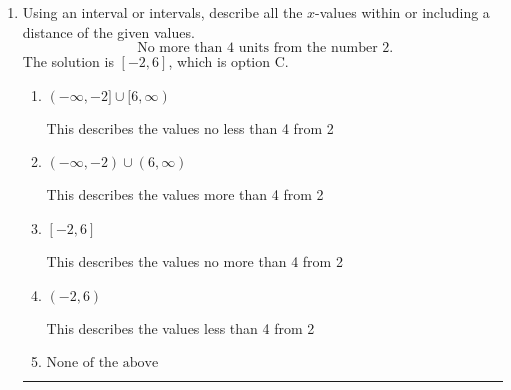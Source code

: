 \documentclass{extbook}[14pt]
\newcommand{\litem}[1]{\item #1

\rule{\textwidth}{0.4pt}}
\begin{document}
\begin{enumerate}
{\begin{enumerate}[label=\Alph*.]
$(-\infty, 4.71] \cup (-7.67, \infty)$, which corresponds to displaying the and-inequality as an or-inequality and getting negatives of the actual endpoints.
\item \( (-\infty, a) \cup [b, \infty), \text{ where } a \in [4.5, 8.25] \text{ and } b \in [-8.25, -6] \)

$(-\infty, 4.71) \cup [-7.67, \infty)$, which corresponds to displaying the and-inequality as an or-inequality AND flipping the inequality AND getting negatives of the actual endpoints.
\item \( [a, b), \text{ where } a \in [3.75, 5.25] \text{ and } b \in [-9.75, -1.5] \)

$[4.71, -7.67)$, which is the correct interval but negatives of the actual endpoints.
\item \( (a, b], \text{ where } a \in [2.25, 6.75] \text{ and } b \in [-9.75, -4.5] \)

$(4.71, -7.67]$, which corresponds to flipping the inequality and getting negatives of the actual endpoints.
\item \( \text{None of the above.} \)

* This is correct as the answer should be $[-4.71, 7.67)$.
\end{enumerate}

\textbf{General Comment:} To solve, you will need to break up the compound inequality into two inequalities. Be sure to keep track of the inequality! It may be best to draw a number line and graph your solution.
}
\litem{
Using an interval or intervals, describe all the $x$-values within or including a distance of the given values.
\[ \text{ No more than } 4 \text{ units from the number } 2. \]The solution is \( [-2, 6] \), which is option C.\begin{enumerate}[label=\Alph*.]
\item \( (-\infty, -2] \cup [6, \infty) \)

This describes the values no less than 4 from 2
\item \( (-\infty, -2) \cup (6, \infty) \)

This describes the values more than 4 from 2
\item \( [-2, 6] \)

This describes the values no more than 4 from 2
\item \( (-2, 6) \)

This describes the values less than 4 from 2
\item \( \text{None of the above} \)


\end{enumerate}}
\end{enumerate}
\end{document}
